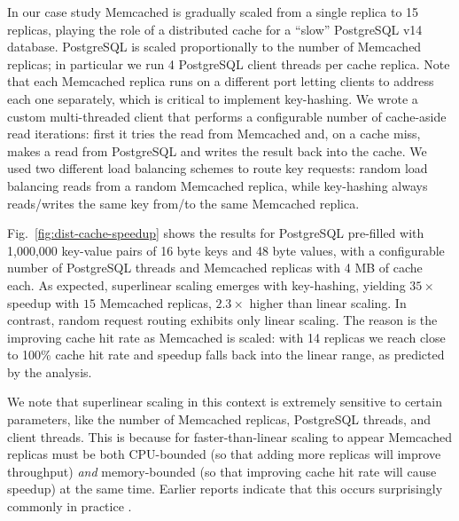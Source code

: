 In our case study Memcached is gradually scaled from a single replica to 15 replicas, playing the role of a distributed cache for a ``slow'' PostgreSQL v14 database. PostgreSQL is scaled proportionally to the number of Memcached replicas; in particular we run 4 PostgreSQL client threads per cache replica. Note that each Memcached replica runs on a different port letting clients to address each one separately, which is critical to implement key-hashing. We wrote a custom multi-threaded client that performs a configurable number of cache-aside read iterations: first it tries the read from Memcached and, on a cache miss, makes a read from PostgreSQL and writes the result back into the cache. We used two different load balancing schemes to route key requests: random load balancing reads from a random Memcached replica, while key-hashing always reads\slash writes the same key from\slash to the same Memcached replica.

Fig.~\ref{fig:dist-cache-speedup} shows the results for PostgreSQL pre-filled with 1,000,000 key-value pairs of 16 byte keys and 48 byte values, with a configurable number of PostgreSQL threads and Memcached replicas with 4 MB of cache each. As expected, superlinear scaling emerges with key-hashing, yielding $35\times$ speedup with $15$ Memcached replicas, $2.3\times$ higher than linear scaling. In contrast, random request routing exhibits only linear scaling. The reason is the improving cache hit rate as Memcached is scaled: with 14 replicas we reach close to 100\% cache hit rate and speedup falls back into the linear range, as predicted by the analysis.

We note that superlinear scaling in this context is extremely sensitive to certain parameters, like the number of Memcached replicas, PostgreSQL threads, and client threads. This is because for faster-than-linear scaling to appear Memcached replicas must be both CPU-bounded (so that adding more replicas will improve throughput) \emph{and} memory-bounded (so that improving cache hit rate will cause speedup) at the same time. Earlier reports indicate that this occurs surprisingly commonly in practice \cite{dobb-1, dobb-2, 7733347, 80148, 556383, scalability-analyzed}.

